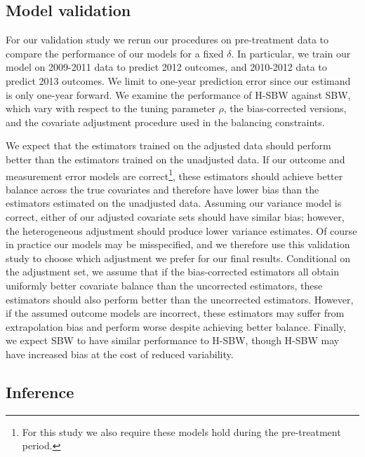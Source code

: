 \documentclass[aoas]{imsart}
\theoremstyle{plain}
\theoremstyle{remark}
\begin{document}
\subsection{Model validation}

For our validation study we rerun our procedures on pre-treatment data to compare the performance of our models for a fixed $\delta$. In particular, we train our model on 2009-2011 data to predict 2012 outcomes, and 2010-2012 data to predict 2013 outcomes. We limit to one-year prediction error since our estimand is only one-year forward. We examine the performance of H-SBW against SBW, which vary with respect to the tuning parameter $\rho$, the bias-corrected versions, and the covariate adjustment procedure used in the balancing constraints. 

We expect that the estimators trained on the adjusted data should perform better than the estimators trained on the unadjusted data. If our outcome and measurement error models are correct\footnote{For this study we also require these models hold during the pre-treatment period.}, these estimators should achieve better balance across the true covariates and therefore have lower bias than the estimators estimated on the unadjusted data. Assuming our variance model is correct, either of our adjusted covariate sets should have similar bias; however, the heterogeneous adjustment should produce lower variance estimates. Of course in practice our models may be misspecified, and we therefore use this validation study to choose which adjustment we prefer for our final results. Conditional on the adjustment set, we assume that if the bias-corrected estimators all obtain uniformly better covariate balance than the uncorrected estimators, these estimators should also perform better than the uncorrected estimators. However, if the assumed outcome models are incorrect, these estimators may suffer from extrapolation bias and perform worse despite achieving better balance. Finally, we expect SBW to have similar performance to H-SBW, though H-SBW may have increased bias at the cost of reduced variability. 

\subsection{Inference}
\end{document}
